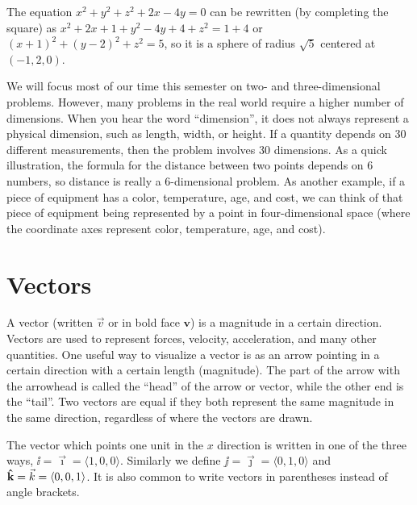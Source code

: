 \begin{example}
  The equation $x^2+y^2+z^2+2x-4y = 0$ can be rewritten (by completing
  the square) as $x^2+2x+1+y^2-4y+4+z^2=1+4$ or
  $(x+1)^2+(y-2)^2+z^2=5$, so it is a sphere of radius $\sqrt 5$
  centered at $(-1,2,0)$.
\end{example}

We will focus most of our time this semester on two- and
three-dimensional problems. However, many problems in the real world
require a higher number of dimensions. When you hear the word
``dimension'', it does not always represent a physical dimension, such
as length, width, or height.  If a quantity depends on 30 different
measurements, then the problem involves 30 dimensions.  As a quick
illustration, the formula for the distance between two points depends
on 6 numbers, so distance is really a 6-dimensional problem.  As
another example, if a piece of equipment has a color, temperature,
age, and cost, we can think of that piece of equipment being
represented by a point in four-dimensional space (where the coordinate
axes represent color, temperature, age, and cost).

\section{Vectors}
A vector (written $\vec v$ or in bold face $\mathbf{v}$) is a
magnitude in a certain direction. Vectors are used to represent
forces, velocity, acceleration, and many other quantities. One useful
way to visualize a vector is as an arrow pointing in a certain
direction with a certain length (magnitude).  
The part of the arrow
with the arrowhead is called the ``head'' of the arrow or vector,
while the other end is the ``tail''.  Two vectors are equal if they
both represent the same magnitude in the same direction, regardless of
where the vectors are drawn.
{}



The vector which points one unit in the $x$ direction is written in
one of the three ways, $\ii = \vec \imath= \langle1,0,0\rangle$. Similarly we define
$\jj = \vec \jmath= \langle0,1,0\rangle$ and $\mathbf{\hat k} = \vec k = \langle0,0,1\rangle$. It is also
common to write vectors in parentheses instead of angle brackets.


